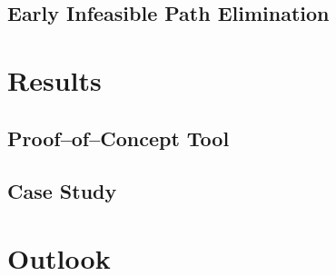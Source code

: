\documentclass[runningheads,a4paper]{llncs}
\begin{document}
\subsection{Early Infeasible Path Elimination}
\section{Results}
\subsection{Proof--of--Concept Tool}
\subsection{Case Study}
\section{Outlook}



\end{document}
